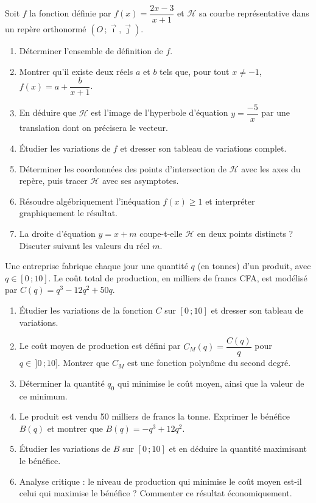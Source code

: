 \documentclass[11pt]{article}
\begin{document}
\begin{exercice}
Soit $f$ la fonction définie par $f(x)=\dfrac{2x-3}{x+1}$ et $\mathcal{H}$ sa courbe représentative dans un repère orthonormé $(O\,;\vec{\imath},\vec{\jmath})$.
\begin{enumerate}
\item Déterminer l'ensemble de définition de $f$.
\item Montrer qu'il existe deux réels $a$ et $b$ tels que, pour tout $x\neq -1$, $f(x)=a+\dfrac{b}{x+1}$.
\item En déduire que $\mathcal{H}$ est l'image de l'hyperbole d'équation $y=\dfrac{-5}{x}$ par une translation dont on précisera le vecteur.
\item Étudier les variations de $f$ et dresser son tableau de variations complet.
\item Déterminer les coordonnées des points d'intersection de $\mathcal{H}$ avec les axes du repère, puis tracer $\mathcal{H}$ avec ses asymptotes.
\item Résoudre algébriquement l'inéquation $f(x)\geq 1$ et interpréter graphiquement le résultat.
\item La droite d'équation $y=x+m$ coupe-t-elle $\mathcal{H}$ en deux points distincts ? Discuter suivant les valeurs du réel $m$.
\end{enumerate}
\end{exercice}

\begin{exercice}
Une entreprise fabrique chaque jour une quantité $q$ (en tonnes) d'un produit, avec $q\in[0\,;10]$. Le coût total de production, en milliers de francs CFA, est modélisé par $C(q)=q^{3}-12q^{2}+50q$.
\begin{enumerate}
\item Étudier les variations de la fonction $C$ sur $[0\,;10]$ et dresser son tableau de variations.
\item Le coût moyen de production est défini par $C_{M}(q)=\dfrac{C(q)}{q}$ pour $q\in\,]0\,;10]$. Montrer que $C_{M}$ est une fonction polynôme du second degré.
\item Déterminer la quantité $q_{0}$ qui minimise le coût moyen, ainsi que la valeur de ce minimum.
\item Le produit est vendu \SI{50}{} milliers de francs la tonne. Exprimer le bénéfice $B(q)$ et montrer que $B(q)=-q^{3}+12q^{2}$.
\item Étudier les variations de $B$ sur $[0\,;10]$ et en déduire la quantité maximisant le bénéfice.
\item Analyse critique : le niveau de production qui minimise le coût moyen est-il celui qui maximise le bénéfice ? Commenter ce résultat économiquement.
\end{enumerate}
\end{exercice}
\end{document}
